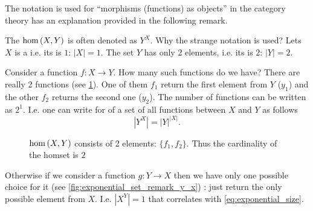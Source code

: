 The notation is used for ``morphisms (functions) as objects'' in the
category theory has an explanation provided in the following remark.
\begin{remark}
The  $\catmset{X}{Y}$ is often denoted as $Y^X$.
Why the strange notation is used? 
Lets $X$ is a  i.e. its
 is $1$: $\left|X\right| = 1$. 
The set $Y$ has only 2
elements, i.e. its  is $2$: 
$\left|Y\right|= 2$. 

Consider a function $f: X \to Y$. How many such functions do we have?
There are really 2 functions (see \cref{fig:exponential_set_remark_x_y}).
One of them $f_1$ return the first element 
from $Y$ ($y_1$) and the other $f_2$ returns the second one ($y_2$).
The number of functions can be written as 
$2^1$. I.e. one can write for  of a set of
all functions between $X$ and $Y$ as follows
\begin{equation}
\label{eq:exponential_size}
\left|Y^X\right| = \left|Y\right|^{\left|X\right|}.
\end{equation}
\begin{figure}[H]
  \centering
  \caption{$\catmset{X}{Y}$ consists of 2 elements: $\{f_1, f_2\}$.
    Thus the cardinality of the homset is $2$}
  \label{fig:exponential_set_remark_x_y}
\end{figure}


Otherwise if we consider a function $g: Y \to X$ then we have only one
possible choice for it (see \cref{fig:exponential_set_remark_y_x}) : just return the only possible element from
$X$. I.e. $\left|X^Y\right| = 1$ that correlates with
\eqref{eq:exponential_size}. 
\begin{figure}[H]
  \centering
  \begin{tikzpicture}[ele/.style={fill=black,circle,minimum
        width=.8pt,inner sep=1pt},every fit/.style={ellipse,draw,inner
        sep=-2pt}]


\end{tikzpicture}
\end{figure}
\end{remark}
